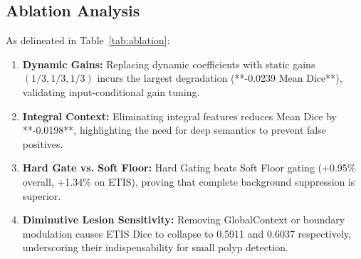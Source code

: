 \documentclass[conference]{IEEEtran}
\begin{document}
\begin{table}[t]
\centering
\caption{Ablation Study of PID-UNet Architectural Components across 5 Benchmarks}
\label{tab:ablation}
\end{table}

\subsection{Ablation Analysis}
As delineated in Table~\ref{tab:ablation}:
\begin{enumerate}
    \item \textbf{Dynamic Gains:} Replacing dynamic coefficients with static gains $(1/3, 1/3, 1/3)$ incurs the largest degradation (**-0.0239 Mean Dice**), validating input-conditional gain tuning.
    \item \textbf{Integral Context:} Eliminating integral features reduces Mean Dice by **-0.0198**, highlighting the need for deep semantics to prevent false positives.
    \item \textbf{Hard Gate vs. Soft Floor:} Hard Gating beats Soft Floor gating (+0.95\% overall, +1.34\% on ETIS), proving that complete background suppression is superior.
    \item \textbf{Diminutive Lesion Sensitivity:} Removing GlobalContext or boundary modulation causes ETIS Dice to collapse to 0.5911 and 0.6037 respectively, underscoring their indispensability for small polyp detection.
\end{enumerate}
\end{document}
